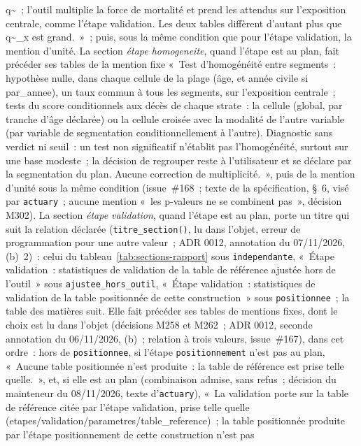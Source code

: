 \documentclass[a4paper,11pt]{article}
\newcommand{\code}[1]{\texttt{\small #1}}
\begin{document}
q\textasciitilde{}~; l'outil multiplie la force de mortalité et prend les
attendus sur l'exposition centrale, comme l'étape validation. Les deux
tables diffèrent d'autant plus que q\textasciitilde{}\_x est grand.~»~;
puis, sous la même condition que pour l'étape validation, la mention
d'unité. La section \emph{étape homogeneite}, quand l'étape est au
plan, fait précéder ses tables de la mention fixe «~Test d'homogénéité
entre segments~: hypothèse nulle, dans chaque cellule de la plage (âge, et
année civile si par\_annee), un taux commun à tous les segments, sur
l'exposition centrale~; tests du score conditionnels aux décès de chaque
strate~: la cellule (global, par tranche d'âge déclarée) ou la cellule
croisée avec la modalité de l'autre variable (par variable de segmentation
conditionnellement à l'autre). Diagnostic sans verdict ni seuil~: un test
non significatif n'établit pas l'homogénéité, surtout sur une base
modeste~; la décision de regrouper reste à l'utilisateur et se déclare par
la segmentation du plan. Aucune correction de multiplicité.~», puis de la
mention d'unité sous la même condition (issue~\#168~; texte de la
spécification, §~6, visé par \code{actuary}~; aucune mention «~les
p-valeurs ne se combinent pas~», décision M302). La section \emph{étape validation},
quand l'étape est au plan, porte un titre qui suit la relation déclarée
(\code{titre\_section()}, lu dans l'objet, erreur de programmation pour
une autre valeur~; ADR 0012, annotation du 07/11/2026, (b)~2)~: celui du
tableau~\ref{tab:sections-rapport} sous \code{independante}, «~Étape
validation~: statistiques de validation de la table de référence ajustée
hors de l'outil~» sous \code{ajustee\_hors\_outil}, «~Étape validation~:
statistiques de validation de la table positionnée de cette
construction~» sous \code{positionnee}~; la table des matières suit. Elle
fait précéder ses tables de mentions fixes, dont
le choix est lu dans l'objet (décisions M258 et M262~; ADR 0012, seconde
annotation du 06/11/2026, (b)~; relation à trois valeurs, issue~\#167), dans
cet ordre~: hors de \code{positionnee}, si l'étape \code{positionnement}
n'est pas au plan, «~Aucune table positionnée n'est produite~: la table de
référence est prise telle quelle.~», et, si elle est au plan (combinaison
admise, sans refus~; décision du mainteneur du 08/11/2026, texte
d'\code{actuary}), «~La validation porte sur la table de référence citée
par l'étape validation, prise telle quelle
(etapes/validation/parametres/table\_reference)~; la table positionnée
produite par l'étape positionnement de cette construction n'est pas
\end{document}
